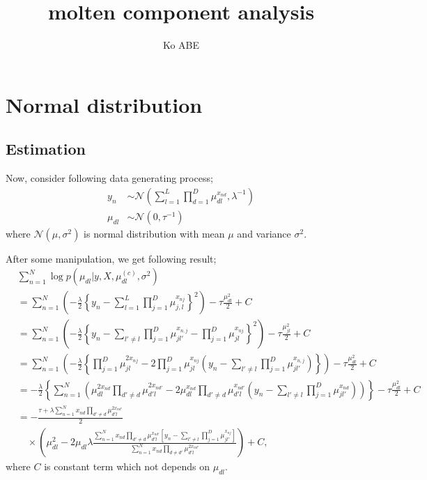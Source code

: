 \documentclass[12pt]{amsart}
\title{molten component analysis}
\author{Ko ABE}
\begin{document}
\maketitle

\section{Normal distribution}
\subsection{Estimation}

Now, consider following data generating process; 
\begin{align*}
y_n &\sim \mathcal{N}\left(\sum_{l=1}^L \prod_{d=1}^D\mu_{dl}^{x_{nd}}, \lambda^{-1}\right)\\
\mu_{dl} & \sim \mathcal{N}(0,\tau^{-1}) %
\end{align*}
where $\mathcal{N}(\mu,\sigma^2)$ is normal distribution with mean $\mu$ and variance $\sigma^2$. 

After some manipulation, we get following result; 
\begin{align*}
&\sum_{n=1}^{N} \log p(\mu_{dl}|y, X, \mu_{dl}^{(c)},\sigma^2)\\
&= \sum_{n=1}^{N}\left(-\frac{\lambda}{2}\left\{ y_n -\sum_{l=1}^L\prod_{j=1}^D \mu_{j,l}^{x_{nj}} \right\}^2\right) -\tau \frac{\mu_{dl}^2}{2} + C\\
&= \sum_{n=1}^{N}\left(-\frac{\lambda}{2}\left\{ y_n -\sum_{l'\neq l}\prod_{j=1}^D \mu_{jl'}^{x_{n,j}}-\prod_{j=1}^D \mu_{jl}^{x_{nj}} \right\}^2\right)-\tau \frac{\mu_{jl}^2}{2}+ C\\
&=\sum_{n=1}^{N}\left(-\frac{\lambda}{2}\left\{\prod_{j =1}^D \mu_{jl}^{2x_{nj}}-2\prod_{j=1}^D \mu_{jl}^{x_{nj}}\left(y_n -\sum_{l'\neq l}\prod_{j=1}^D \mu_{jl'}^{x_{n,j}}\right) \right\}\right) -\tau \frac{\mu_{dl}^2}{2} + C\\
&=-\frac{\lambda}{2}\left\{\sum_{n=1}^N \left( \mu_{dl}^{2x_{nd}}\prod_{d'\neq d} \mu_{d'l}^{2x_{nd'}} - 2 \mu_{dl}^{x_{nd}}\prod_{d' \neq d} \mu_{d'l}^{x_{nd'}}\left(y_n -\sum_{l'\neq l}\prod_{j=1}^D \mu_{jl'}^{x_{nd}}\right) \right)\right\} -\tau \frac{\mu_{dl}^2}{2} + C\\
&=-\frac{\tau  + \lambda \sum_{n=1}^N x_{nd}\prod_{d' \neq d} \mu_{d'l}^{2x_{nd'}} }{2} \\
&\quad \times \left(\mu_{dl}^{2}-2 \mu_{dl} \lambda \frac{\sum_{n=1}^N x_{nd}\prod_{d' \neq d} \mu_{d'l}^{x_{nd'}} \left[y_n -\sum_{l'\neq l}\prod_{j=1}^D \mu_{jl'}^{x_{nj}}  \right] }{\sum_{n=1}^N x_{nd}\prod_{d\neq d'} \mu_{d'l}^{2x_{nd'}} }\right) + C,
\end{align*}
where $C$ is constant term which not depends on $\mu_{dl}$.
\end{document}
